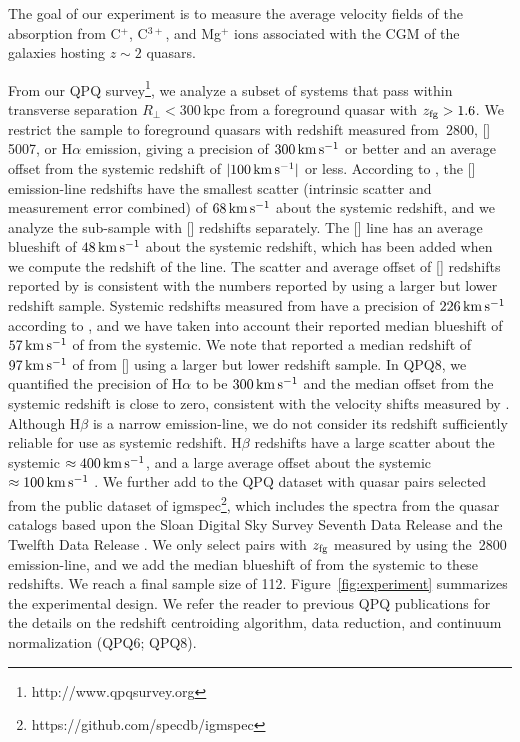 \documentclass[iop]{emulateapj}
\begin{document}
The goal of our experiment is to measure the average velocity fields of the absorption from C$^+$, 
C$^{3+}$, and Mg$^+$ ions associated with the CGM of the galaxies hosting $z\sim 2$ quasars. 

From our QPQ survey\footnote{http://www.qpqsurvey.org}, we analyze a subset of systems that 
pass within transverse separation $R_\perp<300$\,kpc from a foreground quasar with 
$z_{\rm fg} > 1.6$. We restrict the sample to foreground quasars with redshift measured from 
\,2800, []\,5007, or H$\alpha$ emission, giving a precision of 
$300\,{\rm km\,s^{-1}}$ or better and an average offset from the systemic redshift of 
$|100\,{\rm km\,s^{-1}}|$ or less. According to \cite{Shen+16}, the [] emission-line 
redshifts have the smallest scatter (intrinsic scatter and measurement error combined) of 
$68\,{\rm km\,s^{-1}}$ about the systemic redshift, and we analyze the sub-sample with 
[] redshifts separately. The [] line has an average blueshift of 
$48\,{\rm km\,s^{-1}}$ about the systemic redshift, which has been added when we compute the 
redshift of the line. The scatter and average offset of [] redshifts reported by 
\cite{Shen+16} is consistent with the numbers reported by \cite{Boroson05} using a larger but 
lower redshift sample. Systemic redshifts measured from  have a precision of 
$226\,{\rm km\,s^{-1}}$ according to \cite{Shen+16}, and we have taken into account their 
reported median blueshift of $57\,{\rm km\,s^{-1}}$ of  from the systemic. We note that 
\cite{Richards+02} reported a median redshift of $97\,{\rm km\,s^{-1}}$ of  from 
[] using a larger but lower redshift sample. In QPQ8, we quantified 
the precision of H$\alpha$ to be $300\,{\rm km\,s^{-1}}$ and the median offset from the systemic 
redshift is close to zero, consistent with the velocity shifts measured by \cite{Shen+11}. 
Although H$\beta$ is a narrow emission-line, we do not consider its redshift sufficiently reliable 
for use as systemic redshift. H$\beta$ redshifts have a large scatter about the systemic 
$\approx400\,{\rm km\,s^{-1}}$, and a large average offset about the systemic 
$\approx100\,{\rm km\,s^{-1}}$ \citep[][QPQ8]{Shen+16}. 
We further add to the QPQ dataset with quasar pairs selected from the public dataset of 
igmspec\footnote{https://github.com/specdb/igmspec}, which includes the spectra from the quasar 
catalogs based upon the Sloan Digital Sky Survey Seventh Data Release \citep{Schneider+10} and the 
Twelfth Data Release \citep{Paris+17}. We only select pairs with $z_{\rm fg}$ measured by 
\cite{HewettWild10} using the \,2800 emission-line, and we add the median blueshift of 
 from the systemic to these redshifts. We reach a final sample size of 112. 
Figure~\ref{fig:experiment} summarizes the experimental design. We refer the reader to previous 
QPQ publications for the details on the redshift centroiding algorithm, data reduction, and 
continuum normalization (QPQ6; QPQ8). 
\end{document}
